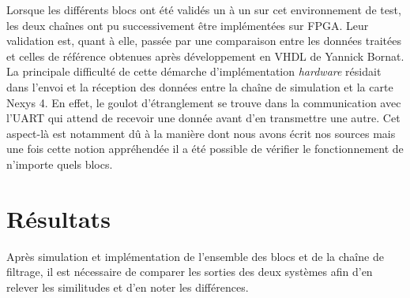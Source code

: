 \documentclass[a4paper,12pt]{article}
\begin{document}
Lorsque les différents blocs ont été validés un à un sur cet environnement de test, les deux chaînes ont pu successivement être implémentées sur FPGA. Leur validation est, quant à elle, passée par une comparaison entre les données traitées et celles de référence obtenues après développement en VHDL de Yannick Bornat. La principale difficulté de cette démarche d'implémentation \textit{hardware} résidait dans l'envoi et la réception des données entre la chaîne de simulation et la carte Nexys 4. En effet, le goulot d'étranglement se trouve dans la communication avec l'UART qui attend de recevoir une donnée avant d'en transmettre une autre. Cet aspect-là est notamment dû à la manière dont nous avons écrit nos sources mais une fois cette notion appréhendée il a été possible de vérifier le fonctionnement de n'importe quels blocs.
\newpage
\section{Résultats}
Après simulation et implémentation de l'ensemble des blocs et de la chaîne de filtrage, il est nécessaire de comparer les sorties des deux systèmes afin d'en relever les similitudes et d'en noter les différences.
\end{document}
